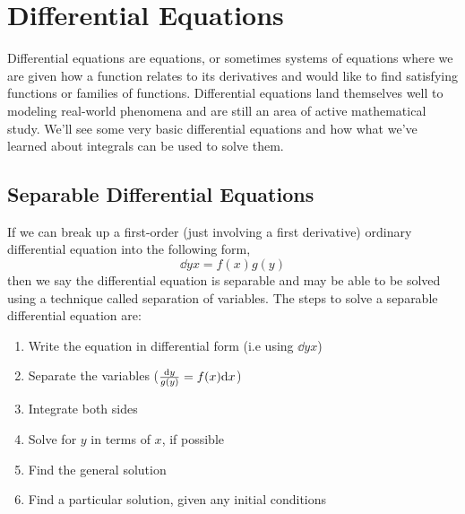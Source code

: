 \section{Differential Equations}
Differential equations are equations, or sometimes systems of equations where we are given how a function relates to its derivatives and would like to find satisfying functions or families of functions.
Differential equations land themselves well to modeling real-world phenomena and are still an area of active mathematical study.
We'll see some very basic differential equations and how what we've learned about integrals can be used to solve them.

\subsection{Separable Differential Equations}
If we can break up a first-order (just involving a first derivative) ordinary differential equation into the following form,
\begin{equation*}
	\dd{y}{x} = f(x)g(y)
\end{equation*}
then we say the differential equation is separable and may be able to be solved using a technique called separation of variables.
The steps to solve a separable differential equation are:
\begin{enumerate}
	\item Write the equation in differential form (i.e using $\dd{y}{x}$)
	\item Separate the variables ($\frac{\mathrm{d} y}{g(y)}=f(x)\mathrm{d} x$)
	\item Integrate both sides
	\item Solve for $y$ in terms of $x$, if possible
	\item Find the general solution
	\item Find a particular solution, given any initial conditions
\end{enumerate}

